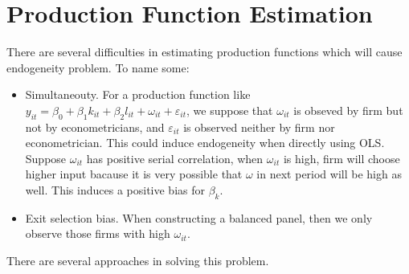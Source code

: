 \documentclass{book}
\theoremstyle{plain}
\theoremstyle{definition}
\begin{document}



\section{Production Function Estimation} %
\label{sec:production_function_estimation}

There are several difficulties in estimating production functions which will cause endogeneity problem. To name some:
\begin{itemize}
	\item Simultaneouty. For a production function like $y_{it}=\beta_0+\beta_1 k_{it}+\beta_2 l_{it} + \omega_{it}+\varepsilon_{it}$, we suppose that $\omega_{it}$ is obseved by firm but not by econometricians, and $\varepsilon_{it}$ is observed neither by firm nor econometrician. This could induce endogeneity when directly using OLS. Suppose $\omega_{it}$ has positive serial correlation, when $\omega_{it}$ is high, firm will choose higher input bacause it is very possible that $\omega$ in next period will be high as well. This induces a positive bias for $\beta_k$.
	\item Exit selection bias. When constructing a balanced panel, then we only observe those firms with high $\omega_{it}$.
\end{itemize}

There are several approaches in solving this problem.
\end{document}

